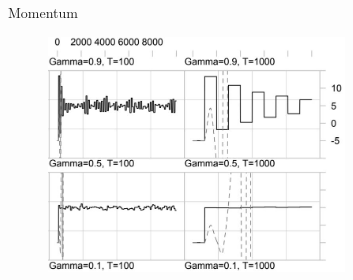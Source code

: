 \documentclass{beamer}
\begin{document}
\begin{frame}{Momentum}
    \begin{figure}
            \centering
            \includegraphics[width=0.7\textwidth]{images/momentum}
            \label{fig:alg}
        \end{figure}
\end{frame}
\end{document}
